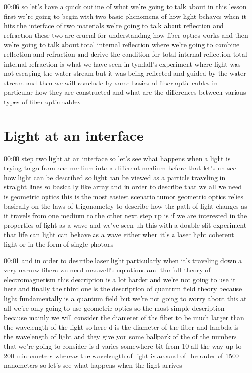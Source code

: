 00:06
so let's have a quick outline of what we're going to talk about in this lesson
first we're going to begin with two basic phenomena of how light behaves
when it hits the interface of two materials
we're going to talk about reflection and refraction
these two are crucial for understanding how fiber optics works
and then we're going to talk about total internal reflection
where we're going to combine reflection and refraction
and derive the condition for total internal reflection total internal refraction
is what we have seen in tyndall's experiment where light was not
escaping the water stream but it was being reflected and guided
by the water stream and then we will conclude by
some basics of fiber optic cables in particular
how they are constructed and what are the differences between various types
of fiber optic cables

\section{Light at an interface}

00:00
step two light at an interface so let's see what happens when a light
is trying to go from one medium into a different medium
before that let's uh see how light can be described
so light can be viewed as a particle traveling in straight lines so basically
like array and in order to describe that we all we
need is geometric optics this is the most
easiest scenario tumor geometric optics relies basically on
the laws of trigonometry to describe how the path of light
changes as it travels from one medium to the other
next step up is if we are interested in the properties of light as a wave
and we've seen uh this with a double slit experiment
that life can light can behave as a wave either
when it's a laser light coherent light or in the form of single photons

00:01
and in order to describe laser light particularly when it's traveling down
a very narrow fibers we need maxwell's equations
and the full theory of electromagnetism this description is a lot harder and
we're not going to use it here and finally the third one
is the description of quantum field theory because light fundamentally is a
quantum field but we're not going to worry about this at all we're only going to
use geometric optics so the most simple description
because mainly we will consider the diameter of the fiber to be much larger
than the wavelength of the light so here d is the diameter of the fiber
and lambda is the wavelength of light and they give you some ballpark of the
of the numbers that we're going to consider
is d varies somewhere bit from 10 all the way up to 200
micrometers whereas the wavelength of light is around
of the order of 1500 nanometers so let's see what happens when the light arrives

